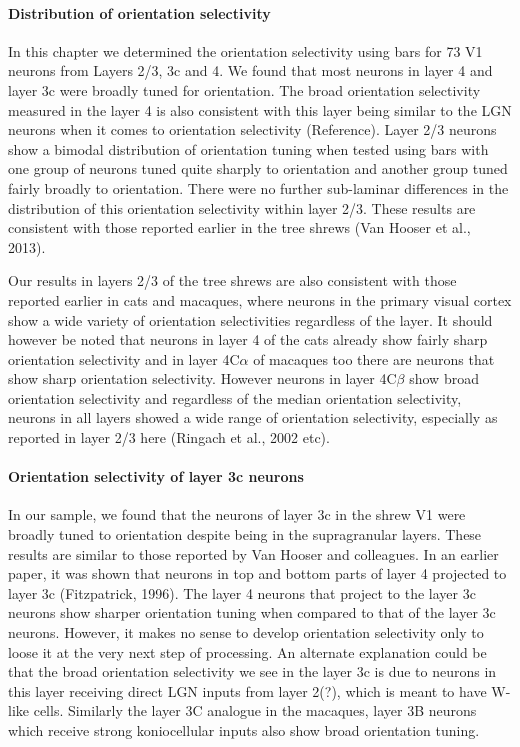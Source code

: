 \paragraph{Distribution of orientation selectivity}

In this chapter we determined the orientation selectivity using bars for 73 V1 neurons from Layers 2/3, 3c and 4. We found that most neurons in layer 4 and layer 3c were broadly tuned for orientation. The broad orientation selectivity measured in the layer 4 is also consistent with this layer being similar to the LGN neurons when it comes to orientation selectivity (Reference). Layer 2/3 neurons show a bimodal distribution of orientation tuning when tested using bars with one group of neurons tuned quite sharply to orientation and another group tuned fairly broadly to orientation. There were no further sub-laminar differences in the distribution of this orientation selectivity within layer 2/3. These results are consistent with those reported earlier in the tree shrews (Van Hooser et al., 2013). 

Our results in layers 2/3 of the tree shrews are also consistent with those reported earlier in cats and macaques, where neurons in the primary visual cortex show a wide variety of orientation selectivities regardless of the layer. It should however be noted that neurons in layer 4 of the cats already show fairly sharp orientation selectivity and in layer 4C$\alpha$ of macaques too there are neurons that show sharp orientation selectivity. However neurons in layer 4C$\beta$ show broad orientation selectivity and regardless of the median orientation selectivity, neurons in all layers showed a wide range of orientation selectivity, especially as reported in layer 2/3 here (Ringach et al., 2002 etc).

\paragraph{Orientation selectivity of layer 3c neurons}

In our sample, we found that the neurons of layer 3c in the shrew V1 were broadly tuned to orientation despite being in the supragranular layers. These results are similar to those reported by Van Hooser and colleagues. In an earlier paper, it was shown that neurons in top and bottom parts of layer 4 projected to layer 3c (Fitzpatrick, 1996). The layer 4 neurons that project to the layer 3c neurons show sharper orientation tuning when compared to that of the layer 3c neurons. However, it makes no sense to develop orientation selectivity only to loose it at the very next step of processing. An alternate explanation could be that the broad orientation selectivity we see in the layer 3c is due to neurons in this layer receiving direct LGN inputs from layer 2(?), which is meant to have W-like cells. Similarly the layer 3C analogue in the macaques, layer 3B neurons which receive strong koniocellular inputs also show broad orientation tuning.

